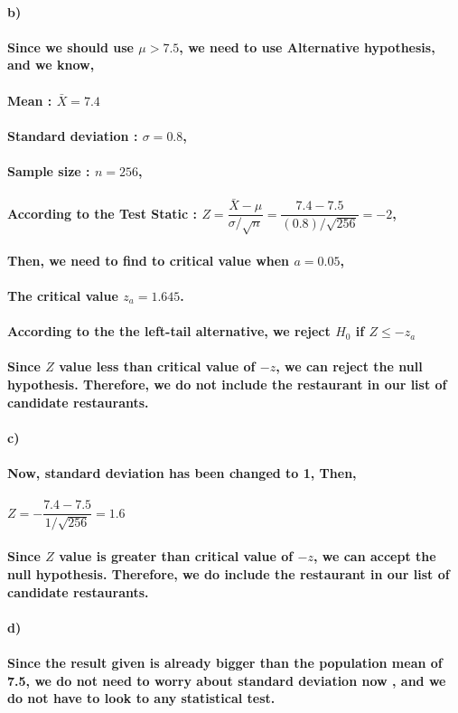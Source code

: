 \documentclass[12pt]{article}
\begin{document}
\paragraph{b)
\\\\ Since we should use $ \mu > 7.5$, we need to use Alternative hypothesis, and we know, 
\\\\ Mean : $\bar{X} = 7.4$ 
\\\\ Standard deviation : $\sigma = 0.8$,
\\\\ Sample size : $n = 256$,
\\\\ According to the Test Static : $ Z = \dfrac{\bar{X} - \mu}{\sigma / \sqrt{n}} = \dfrac{7.4 - 7.5}{(0.8)/ \sqrt{256}}  = -2$,
\\\\ Then, we need to find to critical value when $a = 0.05$, 
\\\\ The critical value $z_{a} = 1.645$.
\\\\ According to the the left-tail alternative, we reject $H_{0}$ if $Z \leq -z_{a}$
\\\\ Since $Z$ value less than critical value of $-z$, we can reject the null hypothesis. Therefore, we do not include the restaurant in our list of candidate restaurants.
}
\newpage
\paragraph{c)
\\\\ Now, standard deviation has been changed to 1, Then,
\\\\ {\hspace*{50}}  $Z= - \dfrac{7.4-7.5}{1/\sqrt{256}} = 1.6$
\\\\ Since $Z$ value is greater than critical value of $-z$, we can accept the null hypothesis. Therefore, we do include the restaurant in our list of candidate restaurants.
}

\paragraph{d)
\\\\Since the result given is already bigger than the population mean of 7.5, we do not need to worry about standard deviation now , and we do not have to look to any statistical test. 
}
\end{document}
